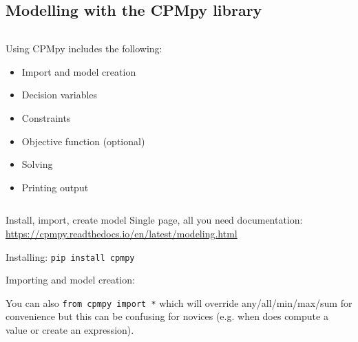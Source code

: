 \documentclass{cons-beamer}
\begin{document}
\begin{flashcardcpmpy}
\section{Modelling with the CPMpy library}

\begin{frame}
  \begin{columns}[T] %
    \begin{column}{0.5\textwidth} %
      \vspace*{5em}
      Using CPMpy includes the following:
      \begin{itemize}
        \item Import and model creation
        \item Decision variables
        \item Constraints
        \item Objective function (optional)
        \item Solving
        \item Printing output
      \end{itemize}
    \end{column}
    \begin{column}{0.5\textwidth} %
      \begin{example}[Showcase]
        \vspace{-0.5em}
        
      \end{example}
    \end{column}
  \end{columns}
\end{frame}

\begin{frame}{Install, import, create model}
  Single page, all you need documentation: 
  \url{https://cpmpy.readthedocs.io/en/latest/modeling.html}

  \vspace{2em}
  Installing:
  \lstinline[basicstyle=\scriptsize\ttfamily]$pip install cpmpy$

  \vspace{2em}
  Importing and model creation:
  

  \vspace{2em}
  \footnotesize
  You can also \lstinline[language=cpmpy]{from cpmpy import *} which will override any/all/min/max/sum for convenience but this can be confusing for novices (e.g. when does  compute a value or create an expression).
\end{frame}


\end{flashcardcpmpy}
\end{document}
